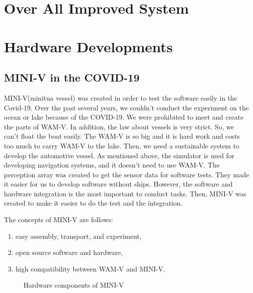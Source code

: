 \documentclass[lettersize,journal]{IEEEtran}
\begin{document}
\section{Over All Improved System}
\section{Hardware Developments}

\subsection{MINI-V in the COVID-19}
MINI-V(minitua vessel) was created in order to test the software easily in the Covid-19. Over the past several years, 
we couldn't conduct the experiment on the ocean or lake because of the COVID-19.
We were prohibited to meet and create the parts of WAM-V.
In addition, the law about vessels is very strict.
So, we can't float the boat easily. The WAM-V is so big and it is hard work and costs too much to carry WAM-V to the lake. 
Then, we need a sustainable system to develop the automotive vessel.
As mentioned above, the simulator is used for developing navigation systems, and it doesn't need to use WAM-V.
The perception array was created to get the sensor data for software tests. They made it easier for us to develop software without ships.
However, the software and hardware integration is the most important to conduct tasks. Then, MINI-V was created 
to make it easier to do the test and the integration.

The concepts of MINI-V are follows:
\begin{enumerate}
  \item easy assembly, transport, and experiment,
  \item open source software and hardware,
  \item high compatibility between WAM-V and MINI-V.
\end{enumerate}

\begin{figure}[h]
  \begin{center}
  \end{center}
  \caption{Hardware components of MINI-V}
  \label{fig:mini_v_component}
\end{figure}
\end{document}

